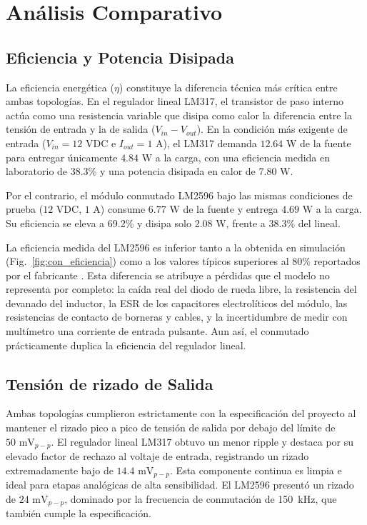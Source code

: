 \documentclass[conference]{IEEEtran}
\begin{document}
\section{\textbf{Análisis Comparativo}}

\FloatBarrier
\subsection{\textbf{Eficiencia y Potencia Disipada}}
La eficiencia energética ($\eta$) constituye la diferencia técnica más crítica entre ambas topologías. En el regulador lineal LM317, el transistor de paso interno actúa como una resistencia variable que disipa como calor la diferencia entre la tensión de entrada y la de salida ($V_{in} - V_{out}$). En la condición más exigente de entrada ($V_{in} = 12\text{ VDC}$ e $I_{out} = 1\text{ A}$), el LM317 demanda $12.64\text{ W}$ de la fuente para entregar únicamente $4.84\text{ W}$ a la carga, con una eficiencia medida en laboratorio de 38.3\% y una potencia disipada en calor de 7.80 W.

Por el contrario, el módulo conmutado LM2596 bajo las mismas condiciones de prueba ($12\text{ VDC}$, $1\text{ A}$) consume $6.77\text{ W}$ de la fuente y entrega $4.69\text{ W}$ a la carga. Su eficiencia se eleva a 69.2\% y disipa solo 2.08 W, frente a 38.3\% del lineal.

La eficiencia medida del LM2596 es inferior tanto a la obtenida en simulación (Fig.~\ref{fig:con_eficiencia}) como a los valores típicos superiores al 80\% reportados por el fabricante \cite{lm2596}. Esta diferencia se atribuye a pérdidas que el modelo no representa por completo: la caída real del diodo de rueda libre, la resistencia del devanado del inductor, la ESR de los capacitores electrolíticos del módulo, las resistencias de contacto de borneras y cables, y la incertidumbre de medir con multímetro una corriente de entrada pulsante. Aun así, el conmutado prácticamente duplica la eficiencia del regulador lineal.

\FloatBarrier
\subsection{\textbf{Tensión de rizado de Salida}}
Ambas topologías cumplieron estrictamente con la especificación del proyecto al mantener el rizado pico a pico de tensión de salida por debajo del límite de $50\text{ mV}_{p-p}$. El regulador lineal LM317 obtuvo un menor ripple y destaca por su elevado factor de rechazo al voltaje de entrada, registrando un rizado extremadamente bajo de $14.4\text{ mV}_{p-p}$. Esta componente continua es limpia e ideal para etapas analógicas de alta sensibilidad. El LM2596 presentó un rizado de $24\text{ mV}_{p-p}$, dominado por la frecuencia de conmutación de 150~kHz, que también cumple la especificación.
\end{document}
